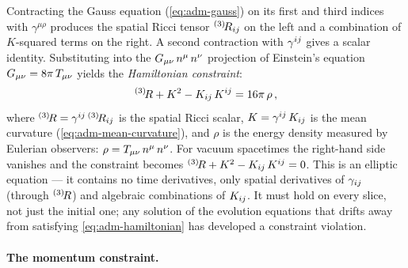 Contracting the Gauss equation (\cref{eq:adm-gauss}) on its first and
third indices with $\gamma^{\mu\rho}$ produces the spatial Ricci tensor
${}^{(3)}\!R_{ij}$ on the left and a combination of $K$-squared terms on the
right.  A second contraction with $\gamma^{ij}$ gives a scalar
identity.  Substituting into the $G_{\mu\nu}\,n^\mu\,n^\nu$ projection of
Einstein's equation $G_{\mu\nu} = 8\pi\,T_{\mu\nu}$ yields the
\emph{Hamiltonian constraint}:
%
\begin{equation}
  {}^{(3)}\!R + K^2
    - K_{ij}\,K^{ij} = 16\pi\,\rho \,,
  \label{eq:adm-hamiltonian}
\end{equation}
%
where ${}^{(3)}\!R = \gamma^{ij}\,{}^{(3)}\!R_{ij}$ is the
spatial Ricci scalar, $K = \gamma^{ij}\,K_{ij}$
is the mean curvature (\cref{eq:adm-mean-curvature}), and $\rho$ is the
energy density measured by Eulerian observers:
$\rho = T_{\mu\nu}\,n^\mu\,n^\nu$.  For vacuum spacetimes the right-hand
side vanishes and the constraint becomes
${}^{(3)}\!R + K^2 - K_{ij}\,K^{ij} = 0$.  This is
an elliptic equation --- it contains no time derivatives, only spatial
derivatives of $\gamma_{ij}$ (through ${}^{(3)}\!R$) and
algebraic combinations of $K_{ij}$.  It must hold on every slice, not
just the initial one; any solution of the evolution equations that drifts
away from satisfying \cref{eq:adm-hamiltonian} has developed a constraint
violation.

\paragraph{The momentum constraint.}

